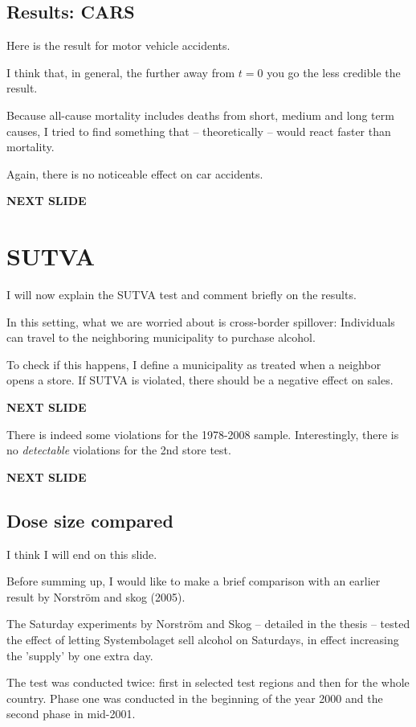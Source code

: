 \documentclass[12pt]{article}
\begin{document}
\subsection{Results: CARS}

Here is the result for motor vehicle accidents.

I think that, in general, the further away from $t = 0$ you go the less credible the result. 

Because all-cause mortality includes deaths from short, medium and long term causes, I tried to find something that -- theoretically -- would react faster than mortality. 

Again, there is no noticeable effect on car accidents.

\textbf{NEXT SLIDE}

\section{SUTVA}

I will now explain the SUTVA test and comment briefly on the results.

In this setting, what we are worried about is cross-border spillover: Individuals can travel to the neighboring municipality to purchase alcohol.

To check if this happens, I define a municipality as treated when a neighbor opens a store. If SUTVA is violated, there should be a negative effect on sales.

\textbf{NEXT SLIDE}

There is indeed some violations for the 1978-2008 sample. Interestingly, there is no \emph{detectable} violations for the 2nd store test. 

\textbf{NEXT SLIDE}

\subsection{Dose size compared}

I think I will end on this slide.

Before summing up, I would like to make a brief comparison with an earlier result by Norström and skog (2005). 

The Saturday experiments by Norström and Skog -- detailed in the thesis --  tested the effect of letting Systembolaget sell alcohol on Saturdays, in effect increasing the 'supply' by one extra day. 

The test was conducted twice: first in selected test regions and then for the whole country. Phase one was conducted in the beginning of the year 2000 and the second phase in mid-2001. 
\end{document}

